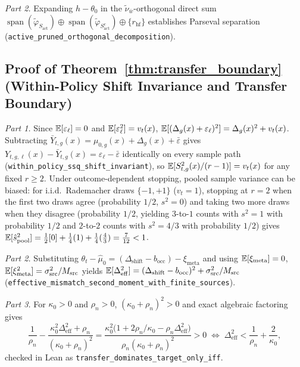 \emph{Part 2.} Expanding $h - \theta_0$ in the $\tilde{\nu}_{\bar{w}}$-orthogonal direct sum $\operatorname{span}(\tilde{\varphi}_{S_{\mathrm{act}}}) \oplus \operatorname{span}(\tilde{\varphi}_{S_{\mathrm{act}}^c}) \oplus \{r_{\mathrm{hf}}\}$ establishes Parseval separation (\texttt{active\_pruned\_orthogonal\_decomposition}).
\Halmos\endproof

\subsection{Proof of Theorem~\ref*{thm:transfer_boundary} (Within-Policy Shift Invariance and Transfer Boundary)}

\emph{Part 1.} Since $\mathbb{E}[\varepsilon_\ell]=0$ and $\mathbb{E}[\varepsilon_\ell^2]=v_t(x)$, $\mathbb{E}[(\Delta_g(x)+\varepsilon_\ell)^2] = \Delta_g(x)^2 + v_t(x)$. Subtracting $\bar{Y}_{t,g}(x) = \mu_{0,g}(x) + \Delta_g(x) + \bar{\varepsilon}$ gives $Y_{t,g,\ell}(x) - \bar{Y}_{t,g}(x) = \varepsilon_\ell - \bar{\varepsilon}$ identically on every sample path (\texttt{within\_policy\_ssq\_shift\_invariant}), so $\mathbb{E}[S_{t,g}^2(x)/(r-1)] = v_t(x)$ for any fixed $r \ge 2$. Under outcome-dependent stopping, pooled sample variance can be biased: for i.i.d.\ Rademacher draws $\{-1, +1\}$ ($v_t = 1$), stopping at $r=2$ when the first two draws agree (probability $1/2$, $s^2 = 0$) and taking two more draws when they disagree (probability $1/2$, yielding $3$-to-$1$ counts with $s^2 = 1$ with probability $1/2$ and $2$-to-$2$ counts with $s^2 = 4/3$ with probability $1/2$) gives $\mathbb{E}[\hat{s}_{\mathrm{pool}}^2] = \tfrac{1}{2}[0] + \tfrac{1}{4}(1) + \tfrac{1}{4}(\tfrac{4}{3}) = \tfrac{7}{12} < 1$.

\emph{Part 2.} Substituting $\theta_t - \hat{\mu}_0 = (\Delta_{\mathrm{shift}} - b_{\mathrm{occ}}) - \xi_{\mathrm{meta}}$ and using $\mathbb{E}[\xi_{\mathrm{meta}}] = 0$, $\mathbb{E}[\xi_{\mathrm{meta}}^2] = \sigma_{\mathrm{src}}^2 / M_{\mathrm{src}}$ yields $\mathbb{E}[\Delta_{\mathrm{eff}}^2] = (\Delta_{\mathrm{shift}} - b_{\mathrm{occ}})^2 + \sigma_{\mathrm{src}}^2 / M_{\mathrm{src}}$ (\texttt{effective\_mismatch\_second\_moment\_with\_finite\_sources}).

\emph{Part 3.} For $\kappa_0 > 0$ and $\rho_n > 0$, $(\kappa_0 + \rho_n)^2 > 0$ and exact algebraic factoring gives
\[
  \frac{1}{\rho_n} - \frac{\kappa_0^2\Delta_{\mathrm{eff}}^2 + \rho_n}{(\kappa_0 + \rho_n)^2}
  = \frac{\kappa_0^2\big(1 + 2\rho_n/\kappa_0 - \rho_n\Delta_{\mathrm{eff}}^2\big)}{\rho_n(\kappa_0 + \rho_n)^2} > 0
  \;\Longleftrightarrow\;
  \Delta_{\mathrm{eff}}^2 < \frac{1}{\rho_n} + \frac{2}{\kappa_0},
\]
checked in Lean as \texttt{transfer\_dominates\_target\_only\_iff}.
\Halmos\endproof

